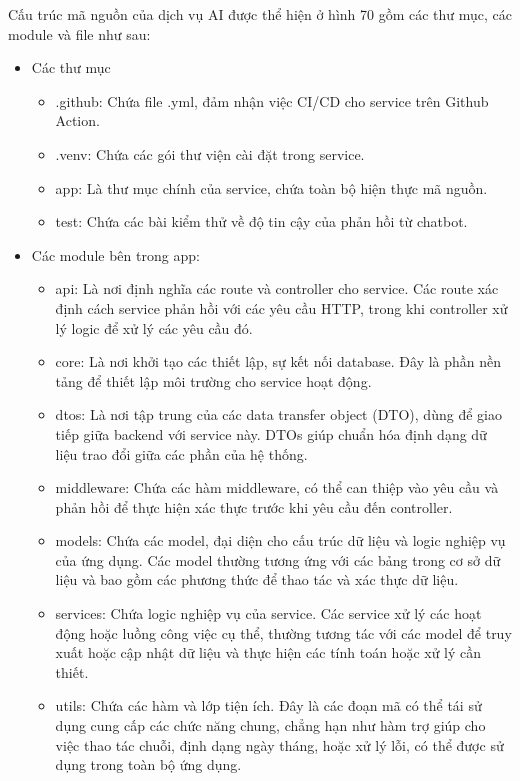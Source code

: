 Cấu trúc mã nguồn của dịch vụ AI được thể hiện ở hình 70 gồm các thư mục, các module và file như sau:
\begin{itemize}
	\item Các thư mục
	\begin{itemize}
		\item .github: Chứa file .yml, đảm nhận việc CI/CD cho service trên Github Action.
		\item .venv: Chứa các gói thư viện cài đặt trong service.
		\item app: Là thư mục chính của service, chứa toàn bộ hiện thực mã nguồn.
		\item test: Chứa các bài kiểm thử về độ tin cậy của phản hồi từ chatbot.
	\end{itemize}

	\item Các module bên trong app:
	\begin{itemize}
		\item api: Là nơi định nghĩa các route và controller cho service. Các route xác định cách service phản hồi với các yêu cầu HTTP, trong khi controller xử lý logic để xử lý các yêu cầu đó.
		\item core: Là nơi khởi tạo các thiết lập, sự kết nối database. Đây là phần nền tảng để thiết lập môi trường cho service hoạt động.
		\item dtos: Là nơi tập trung của các data transfer object (DTO), dùng để giao tiếp giữa backend với service này. DTOs giúp chuẩn hóa định dạng dữ liệu trao đổi giữa các phần của hệ thống.
		\item middleware: Chứa các hàm middleware, có thể can thiệp vào yêu cầu và phản hồi để thực hiện xác thực trước khi yêu cầu đến controller.
		\item models: Chứa các model, đại diện cho cấu trúc dữ liệu và logic nghiệp vụ của ứng dụng. Các model thường tương ứng với các bảng trong cơ sở dữ liệu và bao gồm các phương thức để thao tác và xác thực dữ liệu.
		\item services: Chứa logic nghiệp vụ của service. Các service xử lý các hoạt động hoặc luồng công việc cụ thể, thường tương tác với các model để truy xuất hoặc cập nhật dữ liệu và thực hiện các tính toán hoặc xử lý cần thiết.
		\item utils: Chứa các hàm và lớp tiện ích. Đây là các đoạn mã có thể tái sử dụng cung cấp các chức năng chung, chẳng hạn như hàm trợ giúp cho việc thao tác chuỗi, định dạng ngày tháng, hoặc xử lý lỗi, có thể được sử dụng trong toàn bộ ứng dụng.
	\end{itemize}


\end{itemize}
